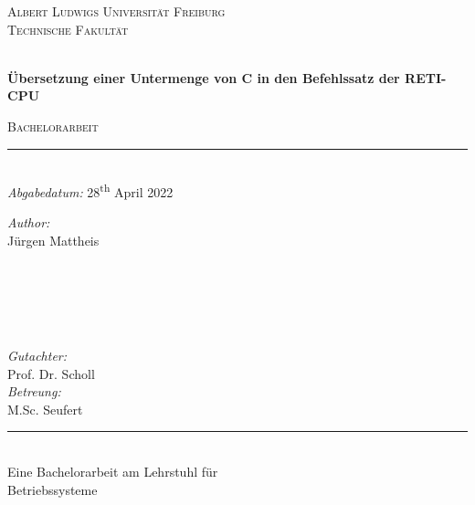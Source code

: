 \begin{titlepage}
  \vspace{1cm}
  \center
  \textsc{\LARGE Albert Ludwigs Universität Freiburg}\\[0.5cm]
  \textsc{\Large Technische Fakultät}\\[2.0cm]


  \begin{tcolorbox}[title={\center \huge \bfseries PicoC-Compiler}, arc=0mm,colback=white,boxrule=0mm]
    \center
    {\bfseries \center \LARGE \\ Übersetzung einer Untermenge von C in den Befehlssatz der RETI-CPU\par}
  \end{tcolorbox}
    \textsc{\large Bachelorarbeit}\\
    \rule{\linewidth}{0.1mm}\\[0.5cm]

  {\large \emph{Abgabedatum:} 28\textsuperscript{th} April 2022}\\[2.5cm]

  \begin{minipage}{0.45\textwidth}
    \begin{flushleft} \large
      \emph{Author:}\\
      Jürgen Mattheis\\
      \hspace{1cm}\\
      \hspace{1cm}\\
      \hspace{1cm}\\
      \hspace{1cm}
    \end{flushleft}
  \end{minipage}
  ~
  \begin{minipage}{0.45\textwidth}
    \begin{flushright} \large
      \emph{Gutachter:}\\
      Prof. Dr. Scholl\\[0.64cm]
      \emph{Betreung:}\\
      M.Sc. Seufert\\
    \end{flushright}
  \end{minipage}

  \vspace{11.cm}
  \rule{11cm}{0.1mm}\\[0.25cm]
  \large{Eine Bachelorarbeit am Lehrstuhl für}\\
  \large{Betriebssysteme}
\end{titlepage}
